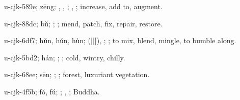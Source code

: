 \begin{multicols}{2}
{\cjkgGlue{}u-cjk-589e; zēng; \cjkgGlue{}, \cjkgGlue{}, \cjkgGlue{}; \cjkgGlue{}, \cjkgGlue{}; increase, add to, augment.

\cjkgGlue{}u-cjk-88dc; bǔ; \cjkgGlue{}\cjkgGlue{}\cjkgGlue{}; \cjkgGlue{}; mend, patch, fix, repair, restore.

\cjkgGlue{}u-cjk-6df7; hǔn, hún, hùn; \cjkgGlue{}\cjkgGlue{}(\cjkgGlue{}|\cjkgGlue{}|\cjkgGlue{}|\cjkgGlue{}), \cjkgGlue{}\cjkgGlue{}\cjkgGlue{}; \cjkgGlue{}; to mix, blend, mingle, to bumble along.

\cjkgGlue{}u-cjk-5bd2; hán; \cjkgGlue{}\cjkgGlue{}\cjkgGlue{}; \cjkgGlue{}; cold, wintry, chilly.

\cjkgGlue{}u-cjk-68ee; sēn; \cjkgGlue{}; \cjkgGlue{}; forest, luxuriant vegetation.

\cjkgGlue{}u-cjk-4f5b; fó, fú; \cjkgGlue{}; \cjkgGlue{}, \cjkgGlue{}; Buddha.

}
\end{multicols}
